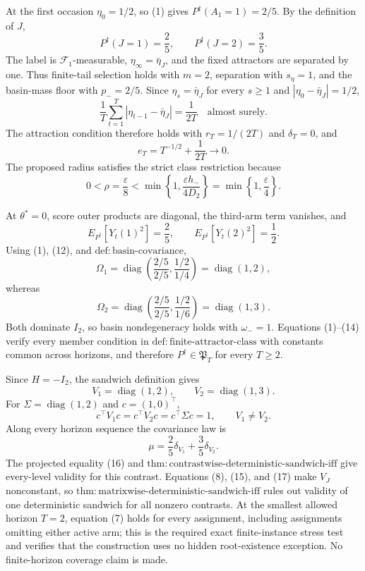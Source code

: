 At the first occasion \(\eta_0=1/2\), so (1) gives
\(P^\dagger(A_1=1)=2/5\).  By the definition of \(J\),
\[
 P^\dagger(J=1)=\frac25,
 \qquad P^\dagger(J=2)=\frac35.
\tag{8}
\]
The label is \(\mathcal F_1\)-measurable,
\(\eta_\infty=\bar\eta_J\), and the fixed attractors are separated by one.
Thus finite-tail selection holds with \(m=2\), separation with \(s_\eta=1\),
and the basin-mass floor with \(p_-=2/5\).  Since
\(\eta_s=\bar\eta_J\) for every \(s\ge1\) and
\(|\eta_0-\bar\eta_J|=1/2\),
\[
 \frac1T\sum_{t=1}^T|\eta_{t-1}-\bar\eta_J|=\frac1{2T}
 \quad\text{almost surely}.
\tag{9}
\]
The attraction condition therefore holds with \(r_T=1/(2T)\) and
\(\delta_T=0\), and
\[
 e_T=T^{-1/2}+\frac1{2T}\longrightarrow0.
\tag{10}
\]
The proposed radius satisfies the strict class restriction because
\[
 0<\rho=\frac\varepsilon8
 <\min\left\{1,\frac{\varepsilon h_-}{4D_2}\right\}
 =\min\left\{1,\frac\varepsilon4\right\}.
\tag{11}
\]

At \(\theta^*=0\), score outer products are diagonal, the third-arm term
vanishes, and
\[
 E_{P^\dagger}[Y_t(1)^2]=\frac25,
 \qquad E_{P^\dagger}[Y_t(2)^2]=\frac12.
\tag{12}
\]
Using (1), (12), and \(\mathrm{def:basin\text{-}covariance}\),
\[
 \Omega_1=\operatorname{diag}\left(\frac{2/5}{2/5},
 \frac{1/2}{1/4}\right)=\operatorname{diag}(1,2),
\tag{13}
\]
whereas
\[
 \Omega_2=\operatorname{diag}\left(\frac{2/5}{2/5},
 \frac{1/2}{1/6}\right)=\operatorname{diag}(1,3).
\tag{14}
\]
Both dominate \(I_2\), so basin nondegeneracy holds with \(\omega_-=1\).
Equations (1)--(14) verify every member condition in
\(\mathrm{def:finite\text{-}attractor\text{-}class}\) with constants common
across horizons, and therefore \(P^\dagger\in\mathfrak P_T\) for every
\(T\ge2\).

Since \(H=-I_2\), the sandwich definition gives
\[
 V_1=\operatorname{diag}(1,2),
 \qquad V_2=\operatorname{diag}(1,3).
\tag{15}
\]
For \(\Sigma=\operatorname{diag}(1,2)\) and \(c=(1,0)^\top\),
\[
 c^\top V_1c=c^\top V_2c=c^\top\Sigma c=1,
 \qquad V_1\ne V_2.
\tag{16}
\]
Along every horizon sequence the covariance law is
\[
 \mu=\frac25\delta_{V_1}+\frac35\delta_{V_2}.
\tag{17}
\]
The projected equality (16) and
\(\mathrm{thm:contrastwise\text{-}deterministic\text{-}sandwich\text{-}iff}\)
give every-level validity for this contrast.  Equations (8), (15), and (17)
make \(V_J\) nonconstant, so
\(\mathrm{thm:matrixwise\text{-}deterministic\text{-}sandwich\text{-}iff}\)
rules out validity of one deterministic sandwich for all nonzero contrasts.
At the smallest allowed horizon \(T=2\), equation (7) holds for every
assignment, including assignments omitting either active arm; this is the
required exact finite-instance stress test and verifies that the construction
uses no hidden root-existence exception.  No finite-horizon coverage claim is
made.